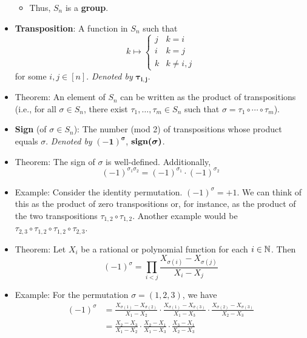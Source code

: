 \documentclass[../notes.tex]{subfiles}
\begin{document}
\begin{itemize}
    \begin{itemize}
        \item Thus, $S_n$ is a \textbf{group}.
    \end{itemize}
    \item \textbf{Transposition}: A function in $S_n$ such that
    \begin{equation*}
        k \mapsto
        \begin{cases}
            j & k=i\\
            i & k=j\\
            k & k\neq i,j
        \end{cases}
    \end{equation*}
    for some $i,j\in[n]$. \emph{Denoted by} $\bm{\tau_{i,j}}$.
    \item Theorem: An element of $S_n$ can be written as the product of transpositions (i.e., for all $\sigma\in S_n$, there exist $\tau_1,\dots,\tau_m\in S_n$ such that $\sigma=\tau_1\circ\cdots\circ\tau_m$).
    \item \textbf{Sign} (of $\sigma\in S_n$): The number (mod 2) of transpositions whose product equals $\sigma$. \emph{Denoted by} $\bm{(-1)^\sigma}$, $\bm{\sgn(\sigma)}$.
    \item Theorem: The sign of $\sigma$ is well-defined. Additionally,
    \begin{equation*}
        (-1)^{\sigma_1\sigma_2} = (-1)^{\sigma_1}\cdot(-1)^{\sigma_2}
    \end{equation*}
    \item Example: Consider the identity permutation. $(-1)^\sigma=+1$. We can think of this as the product of zero transpositions or, for instance, as the product of the two transpositions $\tau_{1,2}\circ\tau_{1,2}$. Another example would be $\tau_{2,3}\circ\tau_{1,2}\circ\tau_{1,2}\circ\tau_{2,3}$.
    \item Theorem: Let $X_i$ be a rational or polynomial function for each $i\in\mathbb{N}$. Then
    \begin{equation*}
        (-1)^\sigma = \prod_{i<j}\frac{X_{\sigma(i)}-X_{\sigma(j)}}{X_i-X_j}
    \end{equation*}
    \item Example: For the permutation $\sigma=(1,2,3)$, we have
    \begin{align*}
        (-1)^\sigma &= \frac{X_{\sigma(1)}-X_{\sigma(2)}}{X_1-X_2}\cdot\frac{X_{\sigma(1)}-X_{\sigma(3)}}{X_1-X_3}\cdot\frac{X_{\sigma(2)}-X_{\sigma(3)}}{X_2-X_3}\\
        &= \frac{X_2-X_3}{X_1-X_2}\cdot\frac{X_2-X_1}{X_1-X_3}\cdot\frac{X_3-X_1}{X_2-X_3}\\

\end{align*}
\end{itemize}
\end{document}
